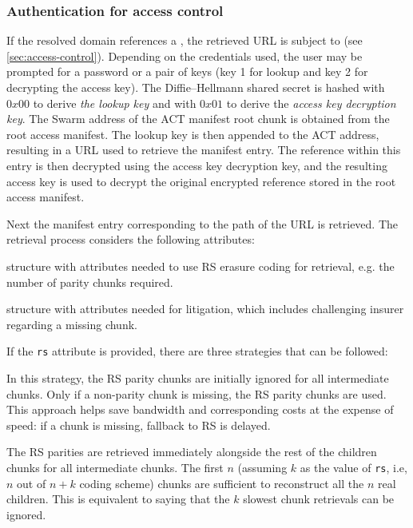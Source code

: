 \subsubsection{Authentication for access control}

If the resolved domain references a , the retrieved URL is subject to  (see \ref{sec:access-control}). 
Depending on the credentials used, the user may be prompted for a password or a pair of keys (key 1 for lookup and key 2 for decrypting the access key). 
The Diffie--Hellmann shared secret is hashed with $0x00$ to derive \emph{the lookup key} and with $0x01$ to derive the \emph{access key decryption key}. The Swarm address of the ACT manifest root chunk is obtained from the root access manifest. 
The lookup key is then appended to the ACT address, resulting in a URL used to retrieve the manifest entry. The reference within this entry is then decrypted using the access key decryption key, and the resulting access key is used to decrypt the original encrypted reference stored in the root access manifest.

Next the manifest entry corresponding to the path of the URL is retrieved. The retrieval process considers the following attributes:


\begin{labelledlist}[noitemsep]
    \item[\lstinline{rs}] {
    structure with attributes needed to use RS erasure coding for retrieval, e.g. the number of parity chunks required}.
    \item[\lstinline{sw3}] { structure with attributes needed for litigation, which includes challenging insurer regarding a missing chunk}. 
\end{labelledlist}


If the \lstinline{rs} attribute is provided, there are three strategies that can be followed: 


\begin{labelledlist}[noitemsep]
\item[\emph{fallback}] In this strategy, the RS parity chunks are initially ignored for all intermediate chunks. Only if a non-parity chunk is missing, the RS parity chunks are used. This approach helps save bandwidth and corresponding costs at the expense of speed: if a chunk is missing, fallback to RS is delayed.
\item[\emph{race}] The RS parities are retrieved immediately alongside the rest of the children chunks for all intermediate chunks. The first $n$ (assuming $k$ as the value of \lstinline{rs}, i.e, $n$ out of $n+k$ coding scheme) chunks are sufficient to reconstruct all the $n$ real children. This is equivalent to saying that the $k$ slowest chunk retrievals can be ignored.  
\end{labelledlist}

